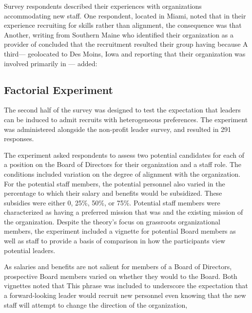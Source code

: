 Survey respondents described their experiences with organizations accommodating new staff. One respondent, located in Miami, noted that in their experience recruiting for skills rather than alignment, the consequence was that  Another, writing from Southern Maine who identified their organization as a provider of  concluded that the recruitment resulted their group having  because  A third--- geolocated to Des Moins, Iowa and reporting that their organization was involved primarily in --- added: 

\subsection{Factorial Experiment}

The second half of the survey was designed to test the expectation that leaders can be induced to admit recruits with heterogeneous preferences.  The experiment was administered alongside the non-profit leader survey, and resulted in 291 responses.

The experiment asked respondents to assess two potential candidates for each of a position on the Board of Directors for their organization and a staff role. The conditions included variation on the degree of alignment with the organization. For the potential staff members, the potential personnel also varied in the percentage to which their salary and benefits would be subsidized. These subsidies were either 0, 25\%, 50\%, or 75\%. Potential staff members were characterized as having a preferred mission that was   and  the existing mission of the organization. Despite the theory's focus on grassroots organizational members, the experiment included a vignette for potential Board members as well as staff to provide a basis of comparison in how the participants view potential leaders. 

As salaries and benefits are not salient for members of a Board of Directors, prospective Board members varied on whether they would  to the Board. Both vignettes noted that  This phrase was included to underscore the expectation that a forward-looking leader would recruit new personnel even knowing that the new staff will attempt to change the direction of the organization, 

